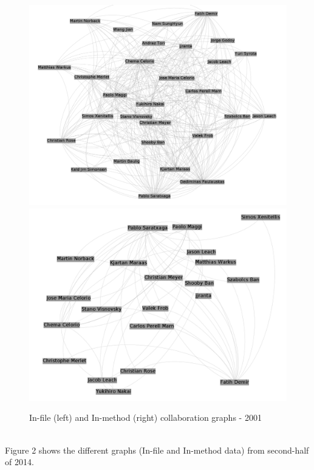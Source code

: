 \documentclass[a4paper]{article}
\begin{document}
\begin{figure}[ht]
\begin{center}
\includegraphics[scale=0.17]{g2001files.png} 
\includegraphics[scale=0.17]{g2001methods.png}
\caption{In-file (left) and In-method (right) collaboration graphs - 2001}
\label{fig1}
\end{center}
\end{figure}

\\
Figure 2 shows the different graphs (In-file and In-method data) from
second-half of 2014.\\
\end{document}
